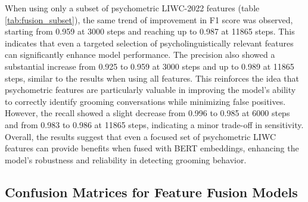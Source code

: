 When using only a subset of psychometric LIWC-2022 features (table \ref{tab:fusion_subset}), the same trend of improvement in F1 score was observed, starting from 0.959 at 3000 steps and reaching up to 0.987 at 11865 steps. This indicates that even a targeted selection of psycholinguistically relevant features can significantly enhance model performance. The precision also showed a substantial increase from 0.925 to 0.959 at 3000 steps and up to 0.989 at 11865 steps, similar to the results when using all features. This reinforces the idea that psychometric features are particularly valuable in improving the model's ability to correctly identify grooming conversations while minimizing false positives. However, the recall showed a slight decrease from 0.996 to 0.985 at 6000 steps and from 0.983 to 0.986 at 11865 steps, indicating a minor trade-off in sensitivity. Overall, the results suggest that even a focused set of psychometric LIWC features can provide benefits when fused with BERT embeddings, enhancing the model's robustness and reliability in detecting grooming behavior.


\subsection{Confusion Matrices for Feature Fusion Models}


